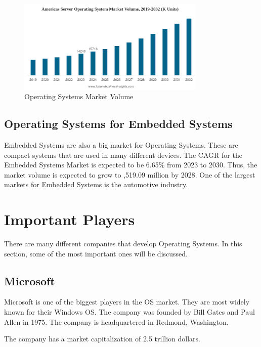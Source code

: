 \begin{figure}[H]
    \centering
    \includegraphics[width=0.8\textwidth]{figures/Server-Market-Volume.png}
    \caption{Operating Systems Market Volume}
    \label{fig:Operating_Systems_for_Servers_Market_Share}
\end{figure}

\cite{ServerOsMarketShare2}

\subsection{Operating Systems for Embedded Systems}

Embedded Systems are also a big market for Operating Systems. These are compact systems that are used in many different devices.
The CAGR for the Embedded Systems Market is expected to be 6.65\% from 2023 to 2030. Thus, the market volume is expected to grow to ,519.09 million by 2028.
One of the largest markets for Embedded Systems is the automotive industry. 

\cite{EmbeddedOsMarketShare}

\section{Important Players}

There are many different companies that develop Operating Systems. In this section, some of the most important ones will be discussed.

\subsection{Microsoft}

Microsoft is one of the biggest players in the OS market. They are most widely known for their Windows OS.
The company was founded by Bill Gates and Paul Allen in 1975. The company is headquartered in Redmond, Washington.

The company has a market capitalization of 2.5 trillion dollars. 

